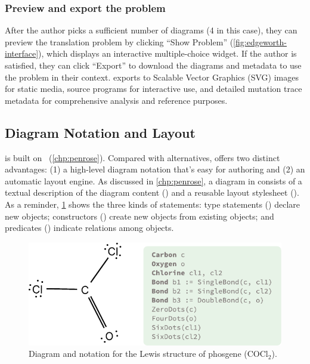 \subsubsection{Preview and export the problem}
After the author picks a sufficient number of diagrams (4 in this case), they can preview the translation problem by clicking ``Show Problem'' (\cref{fig:edgeworth-interface}), which displays an interactive multiple-choice widget. If the author is satisfied, they can click ``Export'' to download the diagrams and metadata to use the problem in their context. \Edgeworth exports to Scalable Vector Graphics (SVG) images for static media, source programs for interactive use, and detailed mutation trace metadata for comprehensive analysis and reference purposes.

\subsection{Diagram Notation and Layout}
\label{sec:edgeworth-layout}

\Edgeworth is built on \Penrose~(\cref{chp:penrose}). Compared with alternatives, \Penrose offers two distinct advantages: (1) a high-level diagram notation that's easy for authoring and (2) an automatic layout engine. As discussed in \cref{chp:penrose}, a diagram in \Penrose consists of a textual description of the diagram content (\Substance) and a reusable layout stylesheet (\Style). As a reminder, \cref{fig:cocl2-example} shows the three kinds of \Substance statements: type statements (\eg {}) declare new objects; constructors () create new objects from existing objects; and predicates () indicate relations among objects. 

\begin{figure}[H]
    \centering
    \includegraphics[width=.6\linewidth]{assets/chapter-3/cocl2-example.pdf}
    \caption{\textmd{Diagram and \Substance notation for the Lewis structure of phosgene (\ensuremath{\mathrm{COCl_2}}).}}
    \label{fig:cocl2-example}
\end{figure}

